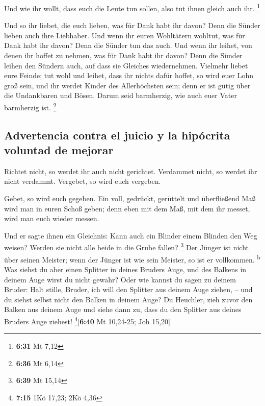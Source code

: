  Und wie ihr wollt, dass euch die Leute tun sollen, also
tut ihnen gleich auch ihr. \footnote{\textbf{6:31} Mt 7,12}

 Und so ihr liebet, die euch lieben, was für Dank habt
ihr davon? Denn die Sünder lieben auch ihre Liebhaber. 
Und wenn ihr euren Wohltätern wohltut, was für Dank habt ihr davon? Denn
die Sünder tun das auch.  Und wenn ihr leihet, von denen
ihr hoffet zu nehmen, was für Dank habt ihr davon? Denn die Sünder
leihen den Sündern auch, auf dass sie Gleiches wiedernehmen.
 Vielmehr liebet eure Feinde; tut wohl und leihet, dass
ihr nichts dafür hoffet, so wird euer Lohn groß sein, und ihr werdet
Kinder des Allerhöchsten sein; denn er ist gütig über die Undankbaren
und Bösen.  Darum seid barmherzig, wie auch euer Vater
barmherzig ist. \footnote{\textbf{6:36} Mt 6,14}

\hypertarget{advertencia-contra-el-juicio-y-la-hipuxf3crita-voluntad-de-mejorar}{%
\subsection{Advertencia contra el juicio y la hipócrita voluntad de
mejorar}\label{advertencia-contra-el-juicio-y-la-hipuxf3crita-voluntad-de-mejorar}}

 Richtet nicht, so werdet ihr auch nicht gerichtet.
Verdammet nicht, so werdet ihr nicht verdammt. Vergebet, so wird euch
vergeben.

 Gebet, so wird euch gegeben. Ein voll, gedrückt,
gerüttelt und überfließend Maß wird man in euren Schoß geben; denn eben
mit dem Maß, mit dem ihr messet, wird man euch wieder messen.

 Und er sagte ihnen ein Gleichnis: Kann auch ein Blinder
einem Blinden den Weg weisen? Werden sie nicht alle beide in die Grube
fallen? \footnote{\textbf{6:39} Mt 15,14}  Der Jünger ist
nicht über seinen Meister; wenn der Jünger ist wie sein Meister, so ist
er vollkommen. \textsuperscript{b}  Was siehst du aber
einen Splitter in deines Bruders Auge, und des Balkens in deinem Auge
wirst du nicht gewahr?  Oder wie kannst du sagen zu
deinem Bruder: Halt stille, Bruder, ich will den Splitter aus deinem
Auge ziehen, -- und du siehst selbst nicht den Balken in deinem Auge? Du
Heuchler, zieh zuvor den Balken aus deinem Auge und siehe dann zu, dass
du den Splitter aus deines Bruders Auge ziehest!
\footnote{\textbf{7:15} 1Kö 17,23; 2Kö 4,36}{[}\textbf{6:40} Mt
10,24-25; Joh 15,20{]}

